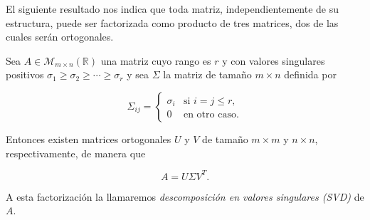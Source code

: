 El siguiente resultado nos indica que toda matriz, independientemente de su estructura, puede ser factorizada como producto de tres matrices, dos de las cuales serán ortogonales.

\begin{teorema}
    Sea $A \in \mathcal{M}_{m \times n}(\mathbb{R})$ una matriz cuyo rango es $r$ y con valores singulares positivos $\sigma_{1} \geq \sigma_{2} \geq \cdots \geq \sigma_{r}$ y sea $\Sigma$ la matriz de tamaño $m \times n$ definida por 

    \[
        \Sigma_{ij} =
        \begin{cases}
            \sigma_i & \text{si } i = j \leq r, \\
            0 & \text{en otro caso.}
        \end{cases}
    \]

    Entonces existen matrices ortogonales $U$ y $V$ de tamaño $m\times m$ y $n\times n$, respectivamente, de manera que

    \[
        A = U \Sigma V^{T}.
    \]

    A esta factorización la llamaremos \emph{descomposición en valores singulares (SVD)} de $A$.
\end{teorema}

